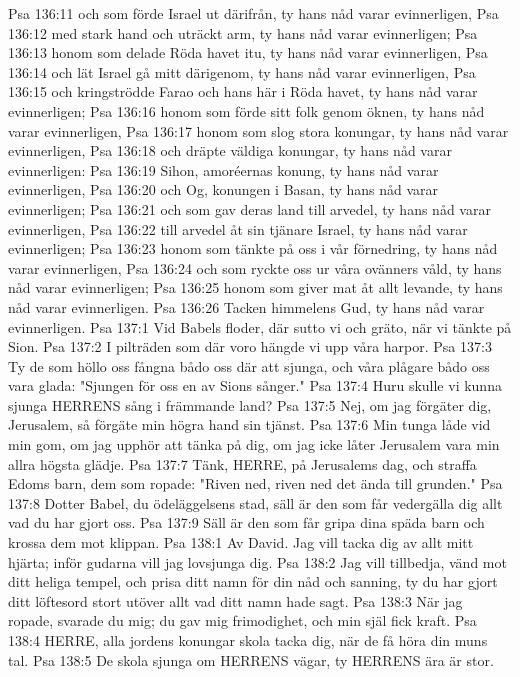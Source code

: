 Psa 136:11  och som förde Israel ut därifrån, ty hans nåd varar evinnerligen,
Psa 136:12  med stark hand och uträckt arm, ty hans nåd varar evinnerligen;
Psa 136:13  honom som delade Röda havet itu, ty hans nåd varar evinnerligen,
Psa 136:14  och lät Israel gå mitt därigenom, ty hans nåd varar evinnerligen,
Psa 136:15  och kringströdde Farao och hans här i Röda havet, ty hans nåd varar evinnerligen;
Psa 136:16  honom som förde sitt folk genom öknen, ty hans nåd varar evinnerligen,
Psa 136:17  honom som slog stora konungar, ty hans nåd varar evinnerligen,
Psa 136:18  och dräpte väldiga konungar, ty hans nåd varar evinnerligen:
Psa 136:19  Sihon, amoréernas konung, ty hans nåd varar evinnerligen,
Psa 136:20  och Og, konungen i Basan, ty hans nåd varar evinnerligen;
Psa 136:21  och som gav deras land till arvedel, ty hans nåd varar evinnerligen,
Psa 136:22  till arvedel åt sin tjänare Israel, ty hans nåd varar evinnerligen;
Psa 136:23  honom som tänkte på oss i vår förnedring, ty hans nåd varar evinnerligen,
Psa 136:24  och som ryckte oss ur våra ovänners våld, ty hans nåd varar evinnerligen;
Psa 136:25  honom som giver mat åt allt levande, ty hans nåd varar evinnerligen.
Psa 136:26  Tacken himmelens Gud, ty hans nåd varar evinnerligen.
Psa 137:1  Vid Babels floder, där sutto vi och gräto, när vi tänkte på Sion.
Psa 137:2  I pilträden som där voro hängde vi upp våra harpor.
Psa 137:3  Ty de som höllo oss fångna bådo oss där att sjunga, och våra plågare bådo oss vara glada: "Sjungen för oss en av Sions sånger."
Psa 137:4  Huru skulle vi kunna sjunga HERRENS sång i främmande land?
Psa 137:5  Nej, om jag förgäter dig, Jerusalem, så förgäte min högra hand sin tjänst.
Psa 137:6  Min tunga låde vid min gom, om jag upphör att tänka på dig, om jag icke låter Jerusalem vara min allra högsta glädje.
Psa 137:7  Tänk, HERRE, på Jerusalems dag, och straffa Edoms barn, dem som ropade: "Riven ned, riven ned det ända till grunden."
Psa 137:8  Dotter Babel, du ödeläggelsens stad, säll är den som får vedergälla dig allt vad du har gjort oss.
Psa 137:9  Säll är den som får gripa dina späda barn och krossa dem mot klippan.
Psa 138:1  Av David. Jag vill tacka dig av allt mitt hjärta; inför gudarna vill jag lovsjunga dig.
Psa 138:2  Jag vill tillbedja, vänd mot ditt heliga tempel, och prisa ditt namn för din nåd och sanning, ty du har gjort ditt löftesord stort utöver allt vad ditt namn hade sagt.
Psa 138:3  När jag ropade, svarade du mig; du gav mig frimodighet, och min själ fick kraft.
Psa 138:4  HERRE, alla jordens konungar skola tacka dig, när de få höra din muns tal.
Psa 138:5  De skola sjunga om HERRENS vägar, ty HERRENS ära är stor.
